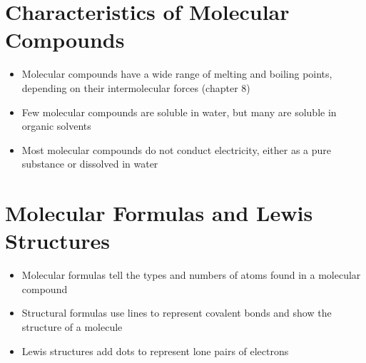 \documentclass[12pt, openany, letterpaper]{memoir}
\begin{document}
\section{Characteristics of Molecular Compounds}
\begin{itemize}
	\item Molecular compounds have a wide range of melting and boiling points, depending on their intermolecular forces (chapter 8)
	\item Few molecular compounds are soluble in water, but many are soluble in organic solvents
	\item Most molecular compounds do not conduct electricity, either as a pure substance or dissolved in water
\end{itemize}
\section{Molecular Formulas and Lewis Structures}
\begin{itemize}
	\item Molecular formulas tell the types and numbers of atoms found in a molecular compound
	\item Structural formulas use lines to represent covalent bonds and show the structure of a molecule
	\item Lewis structures add dots to represent lone pairs of electrons
\end{itemize}
\end{document}
